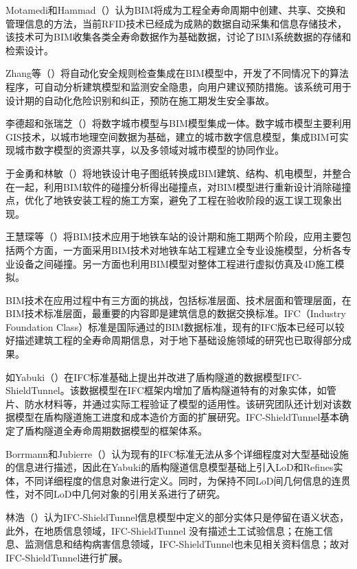 Motamedi和Hammad（\citeyear{motamedi2009lifecycle}）认为BIM将成为工程全寿命周期中创建、共享、交换和管理信息的方法，当前RFID技术已经成为成熟的数据自动采集和信息存储技术，该技术可为BIM收集各类全寿命数据作为基础数据，讨论了BIM系统数据的存储和检索设计。

Zhang等（\citeyear{zhang2013building}）将自动化安全规则检查集成在BIM模型中，开发了不同情况下的算法程序，可自动分析建筑模型和监测安全隐患，向用户建议预防措施。该系统可用于设计期的自动化危险识别和纠正，预防在施工期发生安全事故。

李德超和张瑞芝（\citeyear{李德超2012bim}）将数字城市模型与BIM模型集成一体。数字城市模型主要利用GIS技术，以城市地理空间数据为基础，建立的城市数字信息模型，集成BIM可实现城市数字模型的资源共享，以及多领域对城市模型的协同作业。

于金勇和林敏（\citeyear{于金勇2013bim}）将地铁设计电子图纸转换成BIM建筑、结构、机电模型，并整合在一起，利用BIM软件的碰撞分析得出碰撞点，对BIM模型进行重新设计消除碰撞点，优化了地铁安装工程的施工方案，避免了工程在验收阶段的返工误工现象出现。

王慧琛等（\citeyear{王慧琛2013bim}）将BIM技术应用于地铁车站的设计期和施工期两个阶段，应用主要包括两个方面，一方面采用BIM技术对地铁车站工程建立全专业设施模型，分析各专业设备之间碰撞。另一方面也利用BIM模型对整体工程进行虚拟仿真及4D施工模拟。

BIM技术在应用过程中有三方面的挑战，包括标准层面、技术层面和管理层面，在BIM技术标准层面，最重要的内容即是建筑信息的数据交换标准。IFC（Industry Foundation Class）标准是国际通过的BIM数据标准，现有的IFC版本已经可以较好描述建筑工程的全寿命周期信息，对于地下基础设施领域的研究也已取得部分成果。

如Yabuki（\citeyear{yabuki2013development}）在IFC标准基础上提出并改进了盾构隧道的数据模型IFC-ShieldTunnel。该数据模型在IFC框架内增加了盾构隧道特有的对象实体，如管片、防水材料等，并通过实际工程验证了模型的适用性。该研究团队还计划对该数据模型在盾构隧道施工进度和成本造价方面的扩展研究。IFC-ShieldTunnel基本确定了盾构隧道全寿命周期数据模型的框架体系。

Borrmann和Jubierre（\citeyear{borrmann2013multi}）认为现有的IFC标准无法从多个详细程度对大型基础设施的信息进行描述，因此在Yabuki的盾构隧道信息模型基础上引入LoD和Refines实体，不同详细程度的信息对象进行定义。同时，为保持不同LoD间几何信息的连贯性，对不同LoD中几何对象的引用关系进行了研究。 

林浩（\citeyear{林浩2016基于}）认为IFC-ShieldTunnel信息模型中定义的部分实体只是停留在语义状态，此外，在地质信息领域，IFC-ShieldTunnel 没有描述土工试验信息；在施工信息、监测信息和结构病害信息领域，IFC-ShieldTunnel也未见相关资料信息；故对IFC-ShieldTunnel进行扩展。

